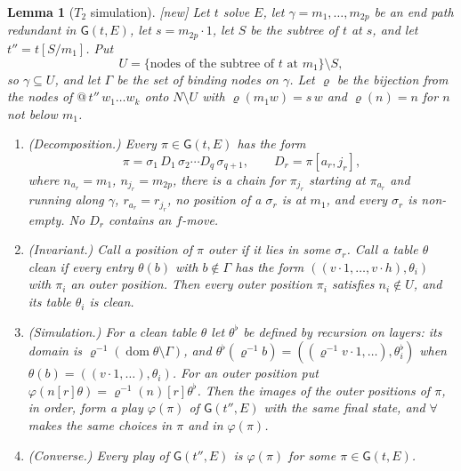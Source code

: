 \documentclass[11pt]{article}
\newcommand{\Gm}{\mathsf{G}}
\newcommand{\suc}[2]{#1{\cdot}#2}
\newcommand{\iv}[2]{\pi[#1,#2]}
\newcommand{\New}{\textsf{[new]}}
\theoremstyle{plain}
\newtheorem{lemma}[theorem]{Lemma}
\theoremstyle{definition}
\theoremstyle{remark}
\begin{document}
\begin{lemma}[$T_2$ simulation]\label{lem:T2sim}
\New{} Let $t$ solve $E$, let $\gamma=m_1,\dots,m_{2p}$ be an end path
redundant in $\Gm(t,E)$, let $s=\suc{m_{2p}}1$, let $S$ be the subtree of
$t$ at $s$, and let $t''=t[S/m_1]$.  Put
\[
U=\{\text{nodes of the subtree of $t$ at $m_1$}\}\setminus S ,
\]
so $\gamma\subseteq U$, and let $\Gamma$ be the set of binding nodes on
$\gamma$.  Let $\varrho$ be the bijection from the nodes of
$@\,t''\,w_1\dots w_k$ onto $N\setminus U$ with
$\varrho(m_1w)=s\,w$ and $\varrho(n)=n$ for $n$ not below $m_1$.
\begin{enumerate}
\item \emph{(Decomposition.)} Every $\pi\in\Gm(t,E)$ has the form
  \[
  \pi=\sigma_1\,D_1\,\sigma_2\cdots D_q\,\sigma_{q+1},\qquad
  D_r=\iv{a_r}{j_r},
  \]
  where $n_{a_r}=m_1$, $n_{j_r}=m_{2p}$, there is a chain for
  $\pi_{j_r}$ starting at $\pi_{a_r}$ and running along $\gamma$,
  $r_{a_r}=r_{j_r}$, no position of a $\sigma_r$ is at $m_1$, and every
  $\sigma_r$ is non-empty.  No $D_r$ contains an $f$-move.
\item \emph{(Invariant.)} Call a position of $\pi$ \emph{outer} if it
  lies in some $\sigma_r$.  Call a table $\theta$ \emph{clean} if every
  entry $\theta(b)$ with $b\notin\Gamma$ has the form
  $((\suc v1,\dots,\suc vh),\theta_i)$ with $\pi_i$ an outer position.
  Then every outer position $\pi_i$ satisfies $n_i\notin U$, and its
  table $\theta_i$ is clean.
\item \emph{(Simulation.)} For a clean table $\theta$ let $\theta^\flat$
  be defined by recursion on layers: its domain is
  $\varrho^{-1}(\operatorname{dom}\theta\setminus\Gamma)$, and
  $\theta^\flat(\varrho^{-1}b)=((\varrho^{-1}\suc v1,\dots),\theta_i^\flat)$
  when $\theta(b)=((\suc v1,\dots),\theta_i)$.  For an outer position put
  $\varphi(n[r]\theta)=\varrho^{-1}(n)[r]\theta^\flat$.  Then the images
  of the outer positions of $\pi$, in order, form a play $\varphi(\pi)$
  of $\Gm(t'',E)$ with the same final state, and $\forall$ makes the same
  choices in $\pi$ and in $\varphi(\pi)$.
\item \emph{(Converse.)} Every play of $\Gm(t'',E)$ is $\varphi(\pi)$ for
  some $\pi\in\Gm(t,E)$.
\end{enumerate}
\end{lemma}
\end{document}
